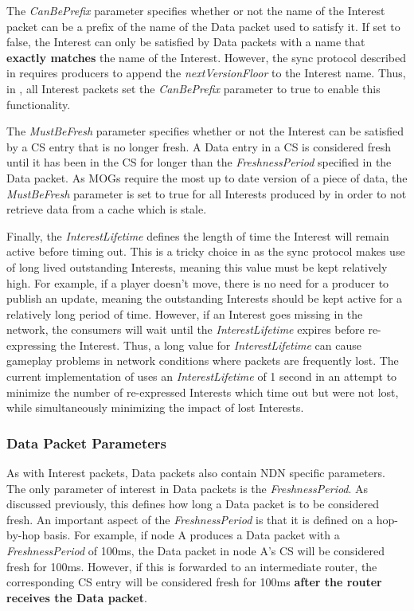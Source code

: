 The \textit{CanBePrefix} parameter specifies whether or not the name of the Interest packet can be a prefix of the name of the Data packet used to satisfy it. If set to false, the Interest can only be satisfied by Data packets with a name that \textbf{exactly matches} the name of the Interest. However, the sync protocol described in  requires producers to append the \textit{nextVersionFloor} to the Interest name. Thus, in \game{}, all Interest packets set the \textit{CanBePrefix} parameter to true to enable this functionality.

The \textit{MustBeFresh} parameter specifies whether or not the Interest can be satisfied by a CS entry that is no longer fresh. A Data entry in a CS is considered fresh until it has been in the CS for longer than the \textit{FreshnessPeriod} specified in the Data packet. As MOGs require the most up to date version of a piece of data, the \textit{MustBeFresh} parameter is set to true for all Interests produced by \game{} in order to not retrieve data from a cache which is stale.

Finally, the \textit{InterestLifetime} defines the length of time the Interest will remain active before timing out. This is a tricky choice in \game{} as the sync protocol makes use of long lived outstanding Interests, meaning this value must be kept relatively high. For example, if a player doesn't move, there is no need for a producer to publish an update, meaning the outstanding Interests should be kept active for a relatively long period of time. However, if an Interest goes missing in the network, the consumers will wait until the \textit {InterestLifetime} expires before re-expressing the Interest. Thus, a long value for \textit{InterestLifetime} can cause gameplay problems in network conditions where packets are frequently lost. The current implementation of \game{} uses an \textit{InterestLifetime} of 1 second in an attempt to minimize the number of re-expressed Interests which time out but were not lost, while simultaneously minimizing the impact of lost Interests.

\subsubsection{Data Packet Parameters}
As with Interest packets, Data packets also contain NDN specific parameters. The only parameter of interest in Data packets is the \textit{FreshnessPeriod}. As discussed previously, this defines how long a Data packet is to be considered fresh. An important aspect of the \textit{FreshnessPeriod} is that it is defined on a hop-by-hop basis. For example, if node A produces a Data packet with a \textit{FreshnessPeriod} of 100ms, the Data packet in node A's CS will be considered fresh for 100ms. However, if this is forwarded to an intermediate router, the corresponding CS entry will be considered fresh for 100ms \textbf{after the router receives the Data packet}. 

